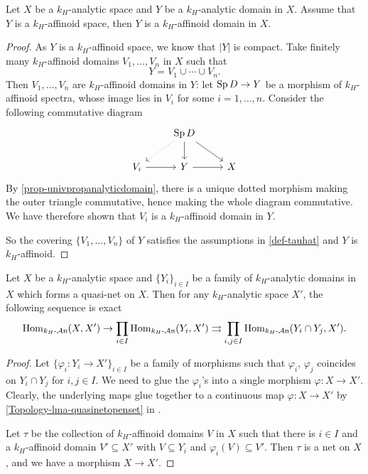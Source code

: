 \begin{proposition}
    Let $X$ be a $k_H$-analytic space and $Y$ be a $k_H$-analytic domain in $X$.  Assume that $Y$ is a $k_H$-affinoid space, then $Y$ is a $k_H$-affinoid domain in $X$.
\end{proposition}
\begin{proof}
    As $Y$ is a $k_H$-affinoid space, we know that $|Y|$ is compact. Take finitely many $k_H$-affinoid domains $V_1,\ldots,V_n$ in $X$ such that
    \[
        Y=V_1\cup\cdots\cup V_n.  
    \]
    Then $V_1,\ldots,V_n$ are $k_H$-affinoid domains in $Y$: let $\operatorname{Sp} D\rightarrow Y$ be a morphism of $k_H$-affinoid spectra, whose image lies in  $V_i$ for some $i=1,\ldots,n$. Consider the following commutative diagram
    \[
        \begin{tikzcd}
            & \Sp D \arrow[ld, dotted] \arrow[d] \arrow[rd] &   \\
        V_i \arrow[r] & Y \arrow[r]                                   & X
        \end{tikzcd}  
    \] 
    By \cref{prop-univpropanalyticdomain}, there is a unique dotted morphism making the outer triangle commutative, hence making the whole diagram commutative. We have therefore shown that $V_i$ is a $k_H$-affinoid domain in $Y$.

    So the covering $\{V_1,\ldots,V_n\}$ of $Y$ satisfies the assumptions in \cref{def-tauhat} and $Y$ is $k_H$-affinoid.
\end{proof}

\begin{proposition}\label{prop-gtopsubcanonical}
    Let $X$ be a $k_H$-analytic space and $\{Y_i\}_{i\in I}$ be a family of $k_H$-analytic domains in $X$ which forms a quasi-net on $X$.
    Then for any $k_H$-analytic space $X'$, the following sequence is exact
    \[
        \operatorname{Hom}_{k_H\text{-}\mathcal{A}\mathrm{n}}(X,X')\rightarrow \prod_{i\in I} \operatorname{Hom}_{k_H\text{-}\mathcal{A}\mathrm{n}}(Y_i,X')\rightrightarrows \prod_{i,j\in I} \operatorname{Hom}_{k_H\text{-}\mathcal{A}\mathrm{n}}(Y_i\cap Y_j,X').
    \]
\end{proposition}
\begin{proof}
    Let $\{\varphi_i:Y_i\rightarrow X'\}_{i\in I}$ be a family of morphisms such that $\varphi_i$, $\varphi_j$ coincides on $Y_i\cap Y_j$ for $i,j\in I$. We need to glue the $\varphi_i$'s into a single morphism $\varphi:X\rightarrow X'$. Clearly, the underlying maps glue together to a continuous map $\varphi:X\rightarrow X'$ by \cref{Topology-lma-quasinetopenset} in . 

    Let $\tau$ be the collection of $k_H$-affinoid domains $V$ in $X$ such that there is $i\in I$ and a $k_H$-affinoid domain $V'\subseteq X'$ with $V\subseteq Y_i$ and $\varphi_i(V)\subseteq V'$. Then $\tau$ is a net on $X$, and we have a morphism $X\rightarrow X'$.
\end{proof}

